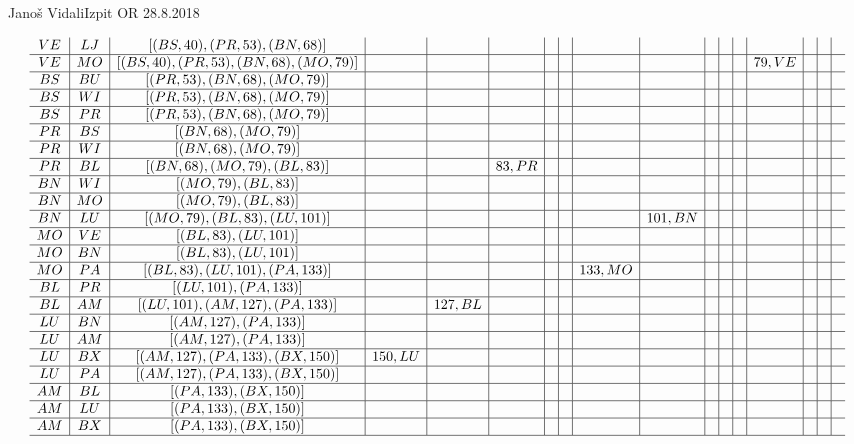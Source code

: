 \begin{naloga}{Janoš Vidali}{Izpit OR 28.8.2018}
\begin{odgovor}
\begin{tabela}
$$\begin{array}{c|c|c|c|c|c|c|c|c|c|c|c|c|c|c|c|c}
VE & LJ & [(BS, 40), (PR, 53), (BN, 68)] & & & & & & & & & & & & & & \\ \hline
VE & MO & [(BS, 40), (PR, 53), (BN, 68), (MO, 79)] & & & & & & & & & & & 79, VE & & & \\ \hline
BS & BU & [(PR, 53), (BN, 68), (MO, 79)] & & & & & & & & & & & & & & \\ \hline
BS & WI & [(PR, 53), (BN, 68), (MO, 79)] & & & & & & & & & & & & & & \\ \hline
BS & PR & [(PR, 53), (BN, 68), (MO, 79)] & & & & & & & & & & & & & & \\ \hline
PR & BS & [(BN, 68), (MO, 79)] & & & & & & & & & & & & & & \\ \hline
PR & WI & [(BN, 68), (MO, 79)] & & & & & & & & & & & & & & \\ \hline
PR & BL & [(BN, 68), (MO, 79), (BL, 83)] & & & 83, PR & & & & & & & & & & & \\ \hline
BN & WI & [(MO, 79), (BL, 83)] & & & & & & & & & & & & & & \\ \hline
BN & MO & [(MO, 79), (BL, 83)] & & & & & & & & & & & & & & \\ \hline
BN & LU & [(MO, 79), (BL, 83), (LU, 101)] & & & & & & & 101, BN & & & & & & & \\ \hline
MO & VE & [(BL, 83), (LU, 101)] & & & & & & & & & & & & & & \\ \hline
MO & BN & [(BL, 83), (LU, 101)] & & & & & & & & & & & & & & \\ \hline
MO & PA & [(BL, 83), (LU, 101), (PA, 133)] & & & & & & 133, MO & & & & & & & & \\ \hline
BL & PR & [(LU, 101), (PA, 133)] & & & & & & & & & & & & & & \\ \hline
BL & AM & [(LU, 101), (AM, 127), (PA, 133)] & & 127, BL & & & & & & & & & & & & \\ \hline
LU & BN & [(AM, 127), (PA, 133)] & & & & & & & & & & & & & & \\ \hline
LU & AM & [(AM, 127), (PA, 133)] & & & & & & & & & & & & & & \\ \hline
LU & BX & [(AM, 127), (PA, 133), (BX, 150)] & 150, LU & & & & & & & & & & & & & \\ \hline
LU & PA & [(AM, 127), (PA, 133), (BX, 150)] &  & & & & & & & & & & & & & \\ \hline
AM & BL & [(PA, 133), (BX, 150)] &  & & & & & & & & & & & & & \\ \hline
AM & LU & [(PA, 133), (BX, 150)] &  & & & & & & & & & & & & & \\ \hline
AM & BX & [(PA, 133), (BX, 150)] &  & & & & & & & & & & & & & \\ \hline

\end{array}$$
\end{tabela}
\end{odgovor}
\end{naloga}
